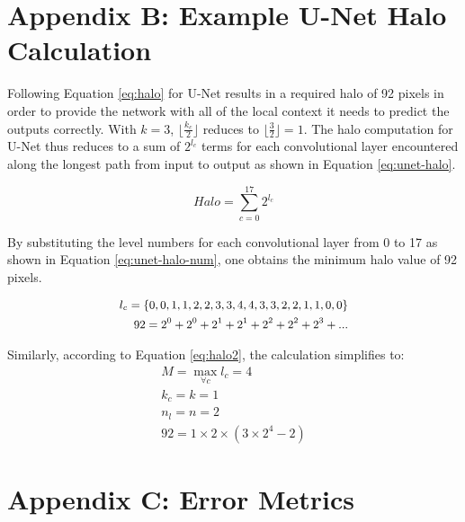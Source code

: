 \section{Appendix B: Example U-Net Halo Calculation}

Following Equation \ref{eq:halo} for U-Net results in a required halo of 92 pixels in order to provide the network with all of the local context it needs to predict the outputs correctly. With $k = 3$, $\lfloor \frac{k_c}{2} \rfloor$ reduces to $\lfloor \frac{3}{2} \rfloor = 1$. The halo computation for U-Net thus reduces to a sum of $2^{l_c}$ terms for each convolutional layer encountered along the longest path from input to output as shown in Equation \ref{eq:unet-halo}. 

\begin{equation}
Halo = \sum_{c=0}^{17} 2^{l_c}
\label{eq:unet-halo}
\end{equation}

By substituting the level numbers for each convolutional layer from 0 to 17 as shown in Equation \ref{eq:unet-halo-num}, one obtains the minimum halo value of 92 pixels. 

\begin{equation}
\begin{small}
\begin{aligned} 
l_c = \{0, 0, 1, 1, 2, 2, 3, 3, 4, 4, 3, 3, 2, 2, 1, 1, 0, 0\} \\
92 = 2^0 + 2^0 + 2^1 + 2^1 + 2^2 + 2^2 + 2^3 + ...
\end{aligned}
\end{small}
\label{eq:unet-halo-num}
\end{equation}

Similarly, according to Equation \ref{eq:halo2}, the calculation simplifies to:
\begin{equation}
\begin{aligned} 
M=\max_{\forall c} { l_c } = 4\\
k_c = k = 1  \\
n_l = n = 2 \\
92 = 1 \times 2 \times (3 \times 2^4 - 2)
\end{aligned}
\label{eq:unet-halo-num2}
\end{equation}


\section{Appendix C: Error Metrics}

